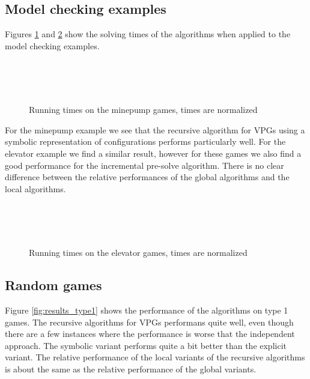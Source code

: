 \subsection{Model checking examples}
Figures \ref{fig:results_minepump} and \ref{fig:results_elevator} show the solving times of the algorithms when applied to the model checking examples.
\begin{figure}[H]
	\centering
	\begin{multicols}{2}
		\\\vfill
		\\
		\\\vfill
		
	\end{multicols}
	\caption{Running times on the minepump games, times are normalized}
	\label{fig:results_minepump}
\end{figure}%
For the minepump example we see that the recursive algorithm for VPGs using a symbolic representation of configurations performs particularly well. For the elevator example we find a similar result, however for these games we also find a good performance for the incremental pre-solve algorithm. There is no clear difference between the relative performances of the global algorithms and the local algorithms.
\begin{figure}[H]
	\centering
	\begin{multicols}{2}
		\\\vfill
		\\
		\\\vfill
		
	\end{multicols}
	\caption{Running times on the elevator games, times are normalized}
	\label{fig:results_elevator}
\end{figure}%

\subsection{Random games}
Figure \ref{fig:results_type1} shows the performance of the algorithms on type 1 games. The recursive algorithms for VPGs performans quite well, even though there are a few instances where the performance is worse that the independent approach. The symbolic variant performs quite a bit better than the explicit variant. The relative performance of the local variants of the recursive algorithms is about the same as the relative performance of the global variants. 

